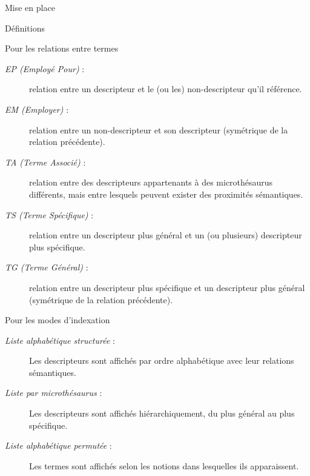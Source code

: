 \documentclass[a4paper, 12pt]{report}
\begin{document}
\begin{chapter}{Mise en place}
\begin{section}{Définitions}
		\begin{subsection}{Pour les relations entre termes}
			\label{glouglou}
			\begin{description}
				\item[\emph{EP (Employé Pour)} :] relation entre un descripteur et le (ou les) non-descripteur qu'il référence.
				\item[\emph{EM (Employer)} :] relation entre un non-descripteur et son descripteur (symétrique de la relation précédente).
				\item[\emph{TA (Terme Associé)} :] relation entre des descripteurs appartenants à des microthésaurus différents, mais entre lesquels peuvent exister des
				proximités sémantiques.
				\item[\emph{TS (Terme Spécifique)} :] relation entre un descripteur plus général et un (ou plusieurs) descripteur plus spécifique.
				\item[\emph{TG (Terme Général)} :] relation entre un descripteur plus spécifique et un descripteur plus général (symétrique de la relation précédente).
			\end{description}
		\end{subsection}
		
		\begin{subsection}{Pour les modes d'indexation}
			\begin{description}
				\item[\emph{Liste alphabétique structurée} :] Les descripteurs sont affichés par ordre alphabétique avec leur relations sémantiques.
				\item[\emph{Liste par microthésaurus} :] Les descripteurs sont affichés hiérarchiquement, du plus général au plus spécifique.
				\item[\emph{Liste alphabétique permutée} :] Les termes sont affichés selon les notions dans lesquelles ils apparaissent.
			\end{description}
		\end{subsection}
	\end{section}
\end{chapter}
\end{document}
